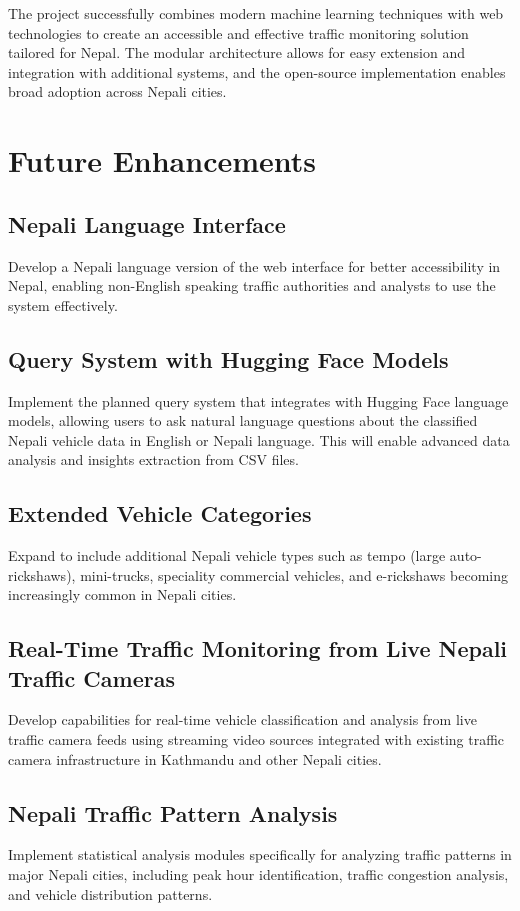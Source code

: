 \documentclass[12pt,a4paper]{report}
\begin{document}
The project successfully combines modern machine learning techniques with web technologies to create an accessible and effective traffic monitoring solution tailored for Nepal. The modular architecture allows for easy extension and integration with additional systems, and the open-source implementation enables broad adoption across Nepali cities.

\section{Future Enhancements}

\subsection{Nepali Language Interface}
Develop a Nepali language version of the web interface for better accessibility in Nepal, enabling non-English speaking traffic authorities and analysts to use the system effectively.

\subsection{Query System with Hugging Face Models}
Implement the planned query system that integrates with Hugging Face language models, allowing users to ask natural language questions about the classified Nepali vehicle data in English or Nepali language. This will enable advanced data analysis and insights extraction from CSV files.

\subsection{Extended Vehicle Categories}
Expand to include additional Nepali vehicle types such as tempo (large auto-rickshaws), mini-trucks, speciality commercial vehicles, and e-rickshaws becoming increasingly common in Nepali cities.

\subsection{Real-Time Traffic Monitoring from Live Nepali Traffic Cameras}
Develop capabilities for real-time vehicle classification and analysis from live traffic camera feeds using streaming video sources integrated with existing traffic camera infrastructure in Kathmandu and other Nepali cities.

\subsection{Nepali Traffic Pattern Analysis}
Implement statistical analysis modules specifically for analyzing traffic patterns in major Nepali cities, including peak hour identification, traffic congestion analysis, and vehicle distribution patterns.
\end{document}
